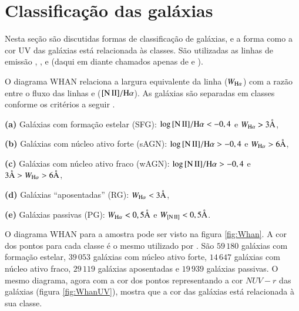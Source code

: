 
\section{Classificação das galáxias}

Nesta seção são discutidas formas de classificação de galáxias, e a forma como a
cor UV das galáxias está relacionada às classes. São utilizadas as linhas de
emissão \Halpha, \Hbeta, \NII e \OIII (daqui em diante chamados apenas de \nII e
\oIII).

O diagrama WHAN relaciona a largura equivalente da linha \Halpha ($W_{\mathrm{H}\alpha}$) com a
razão entre o fluxo das linhas \nII e \Halpha ($\nII/\Halpha$). As galáxias são
separadas em classes conforme os critérios a seguir \citep{CidFernandes2011}.

\begin{list}{}{\setlength\itemsep{0pt}}
\item \textbf{(a)} Galáxias com formação estelar (SFG): $\log{\nII/\Halpha} <
-0,4$ e $W_{\mathrm{H}\alpha} > 3\text{\AA}$,
\item \textbf{(b)} Galáxias com núcleo ativo forte (sAGN): $\log{\nII/\Halpha} >
-0,4$ e $W_{\mathrm{H}\alpha} > 6\text{\AA}$,
\item \textbf{(c)} Galáxias com núcleo ativo fraco (wAGN): $\log{\nII/\Halpha} >
-0,4$ e $3\text{\AA} > W_{\mathrm{H}\alpha} > 6\text{\AA}$,
\item \textbf{(d)} Galáxias ``aposentadas'' (RG): $W_{\mathrm{H}\alpha} < 3\text{\AA}$,
\item \textbf{(e)} Galáxias passivas (PG): $W_{\mathrm{H}\alpha} < 0,5\text{\AA}$ e $W_{\mathrm{[N\,II]}} <
0,5\text{\AA}$.
\end{list}

O diagrama WHAN para a amostra \starlightUV pode ser visto na figura
\ref{fig:Whan}. A cor dos pontos para cada classe é o mesmo utilizado por
\citet{CidFernandes2011}. São $59\,180$ galáxias com formação estelar, $39\,053$
galáxias com núcleo ativo forte, $14\,647$ galáxias com núcleo ativo fraco,
$29\,119$ galáxias aposentadas e $19\,939$ galáxias passivas. O mesmo diagrama,
agora com a cor dos pontos representando a cor $NUV-r$ das galáxias (figura
\ref{fig:WhanUV}), mostra que a cor das galáxias está relacionada à sua classe.

